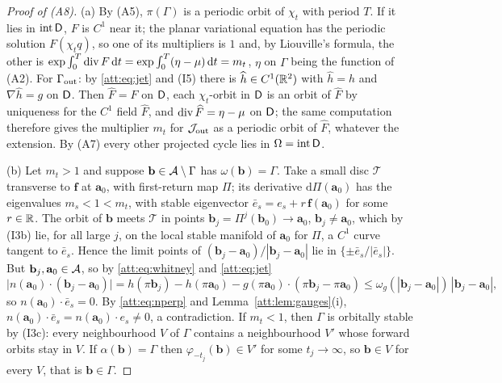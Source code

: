 \begin{proof}[Proof of (A8)]
(a) By (A5), $\pi(\Gamma)$ is a periodic orbit of $\chi_t$ with period $T$. If it lies in $\operatorname{int}\mathsf D$, $F$ is $C^1$ near it; the planar variational equation has the periodic solution $F(\chi_tq)$, so one of its multipliers is $1$ and, by Liouville's formula, the other is $\exp\int_0^T\operatorname{div} F\,\mathrm dt=\exp\int_0^T(\eta-\mu)\,\mathrm dt=m_t$, $\eta$ on $\Gamma$ being the function of (A2). For $\Gamma_{\rm out}$: by \eqref{att:eq:jet} and (I5) there is $\widehat h\in C^1(\mathbb R^2)$ with $\widehat h=h$ and $\nabla\widehat h=g$ on $\mathsf D$. Then $\widehat F=F$ on $\mathsf D$, each $\chi_t$-orbit in $\mathsf D$ is an orbit of $\widehat F$ by uniqueness for the $C^1$ field $\widehat F$, and $\operatorname{div}\widehat F=\eta-\mu$ on $\mathsf D$; the same computation therefore gives the multiplier $m_t$ for $\mathcal J_{\rm out}$ as a periodic orbit of $\widehat F$, whatever the extension. By (A7) every other projected cycle lies in $\Omega=\operatorname{int}\mathsf D$.

(b) Let $m_t>1$ and suppose $\mathbf b\in\mathcal A\setminus\Gamma$ has $\omega(\mathbf b)=\Gamma$. Take a small disc $\mathcal T$ transverse to $\mathbf f$ at $\mathbf a_0$, with first-return map $\Pi$; its derivative $\mathrm d\Pi(\mathbf a_0)$ has the eigenvalues $m_s<1<m_t$, with stable eigenvector $\bar e_s=e_s+r\,\mathbf f(\mathbf a_0)$ for some $r\in\mathbb R$. The orbit of $\mathbf b$ meets $\mathcal T$ in points $\mathbf b_j=\Pi^j(\mathbf b_0)\to\mathbf a_0$, $\mathbf b_j\ne\mathbf a_0$, which by (I3b) lie, for all large $j$, on the local stable manifold of $\mathbf a_0$ for $\Pi$, a $C^1$ curve tangent to $\bar e_s$. Hence the limit points of $(\mathbf b_j-\mathbf a_0)/|\mathbf b_j-\mathbf a_0|$ lie in $\{\pm\bar e_s/|\bar e_s|\}$. But $\mathbf b_j,\mathbf a_0\in\mathcal A$, so by \eqref{att:eq:whitney} and \eqref{att:eq:jet}
\[
\bigl|n(\mathbf a_0)\cdot(\mathbf b_j-\mathbf a_0)\bigr|=h(\pi\mathbf b_j)-h(\pi\mathbf a_0)-g(\pi\mathbf a_0)\cdot(\pi\mathbf b_j-\pi\mathbf a_0)\le\omega_g(|\mathbf b_j-\mathbf a_0|)\,|\mathbf b_j-\mathbf a_0| ,
\]
so $n(\mathbf a_0)\cdot\bar e_s=0$. By \eqref{att:eq:nperp} and Lemma~\ref{att:lem:gauges}(i), $n(\mathbf a_0)\cdot\bar e_s=n(\mathbf a_0)\cdot e_s\ne0$, a contradiction. If $m_t<1$, then $\Gamma$ is orbitally stable by (I3c): every neighbourhood $V$ of $\Gamma$ contains a neighbourhood $V'$ whose forward orbits stay in $V$. If $\alpha(\mathbf b)=\Gamma$ then $\varphi_{-t_j}(\mathbf b)\in V'$ for some $t_j\to\infty$, so $\mathbf b\in V$ for every $V$, that is $\mathbf b\in\Gamma$.


\end{proof}
